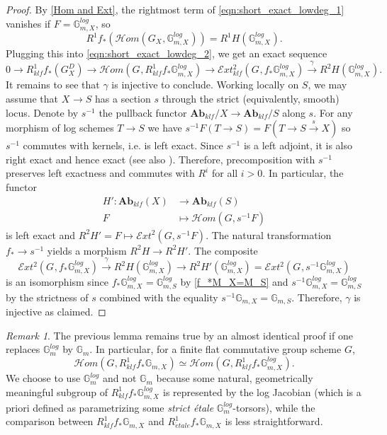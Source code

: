 \documentclass[a4paper,11pt]{amsart} %
\numberwithin{equation}{subsection}
\newcommand{\bb}[1]{{\mathbb{#1}}}
\newcommand{\bd}[1]{{\mathbf{#1}}}
\def\sheafhom{\mathcal{H}om}
\def\sheafext{\mathcal{E}xt}
\newcommand{\cat}[1]{\bd{#1}}
\theoremstyle{definition}
\theoremstyle{plain}%
\theoremstyle{remark}
\newtheorem{remark}[definition]{Remark}
\begin{document}
\begin{proof}
By \ref{Hom and Ext}, the rightmost term of \ref{eqn:short_exact_lowdeg_1} vanishes if $F=\bb G_{m,X}^{log}$, so
\[
R^1f_*(\sheafhom(G_{X_{}},\mathbb{G}_{m,X_{}}^{log})) = R^1H(\mathbb{G}_{m,X_{}}^{log}).
\]
Plugging this into \ref{eqn:short_exact_lowdeg_2}, we get an exact sequence
\[
0 \to R^1_{klf}f_*(G_{X_{}}^D)  \to \sheafhom(G_{},R^1_{klf}f_*\mathbb{G}_{m,X_{}}^{log}) \to \sheafext^2_{klf}(G_{},f_*\mathbb{G}_{m,X_{}}^{log})   \xrightarrow{\gamma} R^2H(\mathbb{G}_{m,X_{}}^{log}).
\]
It remains to see that $\gamma$ is injective to conclude. Working locally on $S$, we may assume that $X_{} \to S$ has a section $s$ through the strict (equivalently, smooth) locus. Denote by $s^{-1}$ the pullback functor $\cat{Ab}_{klf}/X \to \cat{Ab}_{klf}/S$ along $s$. For any morphism of log schemes $T \to S$ we have $s^{-1}F(T \to S)=F(T \to S \xrightarrow{s} X)$ so $s^{-1}$ commutes with kernels, i.e. is left exact. %
Since $s^{-1}$ is a left adjoint, it is also right exact and hence exact  (see also  \cite[\href{https://stacks.math.columbia.edu/tag/00XR}{Tag 00XR}]{stacks-project}). Therefore, precomposition with $s^{-1}$ preserves left exactness and commutes with $R^i$ for all $i>0$. In particular, the functor
\begin{align*}
    H' \colon \cat{Ab}_{klf}(X) & \to \cat{Ab}_{klf}(S) \\
    F & \mapsto \sheafhom(G,s^{-1}F)
\end{align*}
is left exact and $R^2H' = F \mapsto \sheafext^2(G,s^{-1}F)$. The natural transformation $f_* \to s^{-1}$ yields a morphism $R^2H \to R^2H'$. The composite
\begin{equation}\label{lion}
    \sheafext^2(G_{},f_{*}\bb G_{m,X}^{log}) \xrightarrow{\gamma} R^2H(\mathbb{G}_{m,X_{}}^{log}) \to R^2H'(\bb G_{m,X}^{log}) = \sheafext^2(G_{},s^{-1}\bb G_{m,X}^{log})
\end{equation}
is an isomorphism since $f_*\mathbb{G}_{m,X_{}}^{log}=\mathbb{G}_{m,S}^{log}$ by \ref{f_*M_X=M_S} and $s^{-1}\bb G_{m,X}^{log} = \bb G_{m,S}^{log}$ by the strictness of $s$ combined with the equality $s^{-1}\bb G_{m,X} = \bb G_{m,S}$. Therefore, $\gamma$ is injective as claimed.
\end{proof}


\begin{remark}
    The previous lemma remains true by an almost identical proof if one replaces $\mathbb{G}_m^{log}$ by $\mathbb{G}_m$. In particular, for a finite flat commutative group scheme $G$,
   \[
   \sheafhom(G, R^1_{klf}f_*\mathbb{G}_{m,X_{}}^{})\simeq \sheafhom(G, R^1_{klf}f_*\mathbb{G}_{m,X_{}}^{log}).
   \]
 We choose to use $\bb G_m^{log}$ and not $\bb G_m$ because some natural, geometrically meaningful subgroup of $R^1_{klf}f_*\mathbb{G}_{m,X_{}}^{log}$ is represented by the log Jacobian (which is a priori defined as parametrizing some \emph{strict \'etale} $\bb G_m^{log}$-torsors), while the comparison between $R^1_{klf}f_*\mathbb{G}_{m,X_{}}$ and $R^1_{\acute etale}f_*\mathbb{G}_{m,X_{}}$ is less straightforward.
\end{remark}
\end{document}

